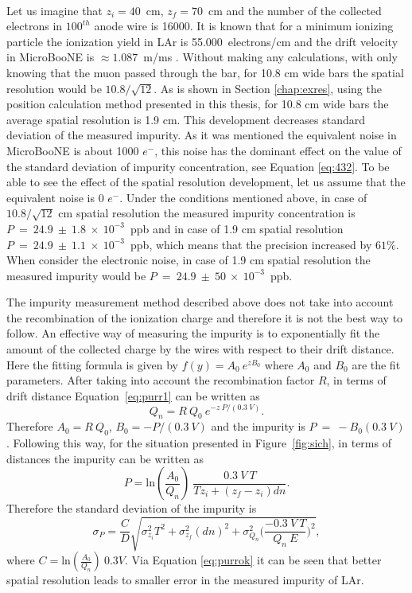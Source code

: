 \documentclass[a4paper]{article}\linespread{1.4}
\begin{document}
\\Let us imagine that $z_{i}=40$~cm, $z_{f}=70$~cm and the number of the collected electrons in $100^{th}$ anode wire is 16000. It is known that for a minimum ionizing particle the ionization yield in LAr is 55.000~electrons/cm and the drift velocity in MicroBooNE is $\approx1.087$~m/ms \cite{1}.
Without making any calculations, with only knowing that the muon passed through the bar, for 10.8 cm wide bars the spatial resolution would be $10.8/\sqrt{12}$.
As is shown in Section \ref{chap:exres}, using the position calculation method presented in this thesis, for 10.8 cm wide bars the average spatial resolution is 1.9 cm.
This development decreases standard deviation of the measured impurity. As it was mentioned the equivalent noise in MicroBooNE is about 1000 $e^{-}$, this noise has the dominant effect on the value of the standard deviation of impurity concentration, see Equation \ref{eq:432}. To be able to see the effect of the spatial resolution development, let us assume that the equivalent noise is 0 $e^{-}$.
Under the conditions mentioned above, in case of $10.8/\sqrt{12}$ cm spatial resolution the measured impurity concentration is $P~=~24.9~\pm~1.8~\times~10^{-3}$~ppb and in case of 1.9 cm spatial resolution $P~=~24.9~\pm~1.1~\times~10^{-3}$~ppb, which means that the precision increased by $61\%$. When consider the electronic noise, in case of 1.9 cm spatial resolution the measured impurity would be $P~=~24.9~\pm~50~\times~10^{-3}$~ppb.

The impurity measurement method described above does not take into account the recombination of the ionization charge and therefore it is not the best way to follow. 
An effective way of measuring the impurity is to exponentially fit the amount of the collected charge by the wires with respect to their drift distance. Here the fitting formula is given by $f(y)=A_{0}~e^{zB_{0}}$ where $A_{0}$ and $B_{0}$ are the fit parameters. After taking into account the recombination factor $R$, in terms of drift distance Equation~\ref{eq:purr1} can be written as
\begin{equation}  Q_{n} = R~Q_{0} \ e^{-z~P/(0.3~V)}  \label{eq:purro}. \end{equation}
Therefore $A_{0}=R~Q_{0}$, $B_{0}=-P/(0.3~V)$ and the impurity is $P~=~-B_{0}(0.3~V)$.
Following this way, for the situation presented in Figure~\ref{fig:sich}, in terms of distances the impurity can be written as
\begin{equation}  P=\mathrm{ln}(\frac{A_{0}}{Q_{n}})~\frac{0.3\ V\ T}{Tz_{i} + (z_{f}-z_{i})d n}.  \label{eq:purrok} \end{equation}
Therefore the standard deviation of the impurity is 
\begin{equation}  \sigma_{P}=\frac{C}{D} \sqrt{\sigma_{z_{i}}^2 T^2  + \sigma_{z_{f}}^2 (dn)^2  + \sigma_{Q_{n}}^2 \Big( \frac{-0.3 \ V \ T}{ Q_{n}\ E} \Big)^2},  \label{eq:purrok} \end{equation}
where $C=\mathrm{ln}(\frac{A_{0}}{Q_{n}})~0.3 V$.
Via Equation \ref{eq:purrok} it can be seen that better spatial resolution leads to smaller error in the measured impurity of LAr.
\end{document}
